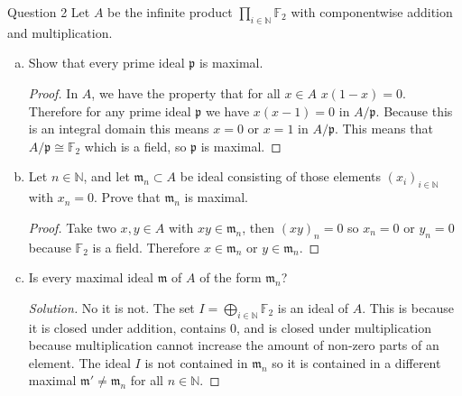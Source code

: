 \documentclass{article}
\newcommand{\N}{\mathbb{N}}
\newcommand{\maxid}{\mathfrak{m}}
\newcommand{\primeid}{\mathfrak{p}}
\newcommand{\F}{\mathbb{F}}
\newenvironment{question}[1][]{\begin{paragraph}{Question #1}}{\end{paragraph}}
\newenvironment{solution}{\begin{proof}[Solution]\renewcommand\qedsymbol{}}{\end{proof}}
\theoremstyle{definition}
\begin{document}
\begin{question}[2]
    Let \(A\) be the infinite product \(\prod_{i\in\N}\F_{2}\) with
    componentwise addition and multiplication.

    \begin{enumerate}[(a)]
        \item Show that every prime ideal \(\primeid\) is maximal.

              \begin{proof}
                  In \(A\), we have the property that for all \(x\in A\)
                  \(x(1-x)=0\). Therefore for any prime ideal \(\primeid\) we
                  have \(x(x-1)=0\) in \(A/\primeid\). Because this is an
                  integral domain this means \(x=0\) or \(x=1\) in
                  \(A/\primeid\). This means that \(A/\primeid\cong\F_{2}\)
                  which is a field, so \(\primeid\) is maximal.
              \end{proof}

        \item Let \(n\in\N\), and let \(\maxid_{n}\subset A\) be ideal
              consisting of those elements \((x_{i})_{i\in\N}\) with \(x_{n}=0\).
              Prove that \(\maxid_{n}\) is maximal.

              \begin{proof}
                  Take two \(x,y\in A\) with \(xy\in\maxid_{n}\), then
                  \((xy)_{n}=0\) so \(x_{n}=0\) or \(y_{n}=0\) because
                  \(\F_{2}\) is a field. Therefore \(x\in\maxid_{n}\) or
                  \(y\in\maxid_{n}\).
              \end{proof}

        \item Is every maximal ideal \(\maxid\) of \(A\) of the form
              \(\maxid_{n}\)?

              \begin{solution}
                  No it is not. The set \(I=\bigoplus_{i\in\N}\F_{2}\) is an
                  ideal of \(A\). This is because it is closed under addition,
                  contains \(0\), and is closed under multiplication because
                  multiplication cannot increase the amount of non-zero parts of
                  an element. The ideal \(I\) is not contained in \(\maxid_{n}\)
                  so it is contained in a different maximal
                  \(\maxid'\neq\maxid_{n}\) for all \(n\in\N\).
              \end{solution}
    \end{enumerate}
\end{question}
\end{document}
